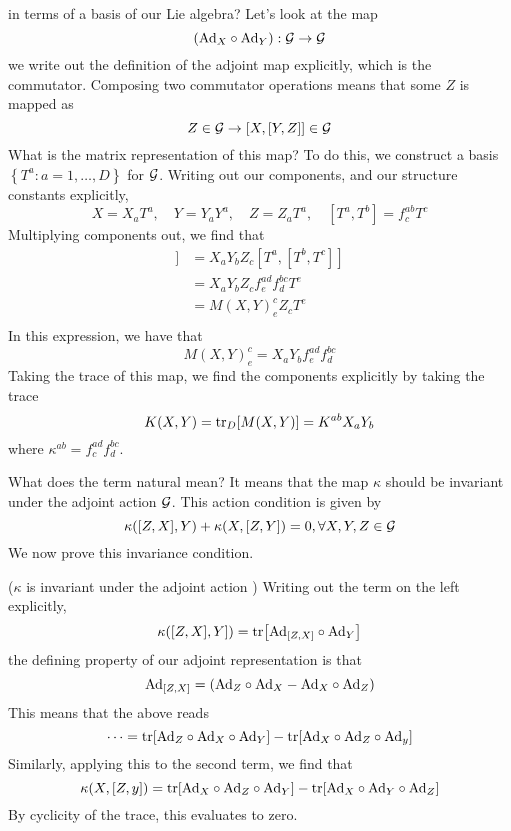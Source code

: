 in terms of a basis of our Lie algebra? Let's look at the map 
\[
 ( \text{Ad}_ X \circ \text{Ad}_ Y ) : \mathcal{ G } \to \mathcal{ G } 
\] we write out the definition of the 
adjoint map explicitly, which is the commutator. 
Composing two commutator operations means that some $ Z $ is mapped 
as
\[
 Z \in \mathcal{ G } \to [ X , [ Y , Z ] ] \in \mathcal{ G }
\] What is the matrix representation of this map? 
To do this, we construct a basis $ \left\{  T ^ a : a = 1, \dots , D  \right\} $ 
for $ \mathcal{ G }$. 
Writing out our components, and our structure constants explicitly, 
 \[
 X  = X_ a T ^ a , \quad 
 Y = Y  _a Y ^ a , \quad
 Z = Z_ a T ^ a, 
 \quad [ T ^ a , T ^ b ] = f ^{ ab } _ c T ^ c 
\] Multiplying components out, 
we find that 
\begin{align*}
	[ X. [ Y , Z ] ] &=  X_a Y _ b Z_ c [ T ^ a , [ T ^ b , T ^ c ]] \\
	&=  X_ a Y _ b Z _ c f ^{ ad } _ e f ^{ bc } _ d T ^ e  \\
	&=  M ( X, Y ) ^ c _ e  Z_ c T ^ e  \\
\end{align*} 
In this expression, we have that 
\[
 M ( X , Y ) ^ c _ e  = X_ a Y _ b f^{ ad } _ e f ^{ bc } _ d 
\] Taking the trace of this map, we 
find the components explicitly by 
taking the trace 
\[
 K ( X, Y ) = \tr _ D [ M ( X, Y ) ] = K ^{ ab } X_ a Y _ b 
\] where $ \kappa ^{ ab } = f ^{ ad } _ c f ^{ bc } _  d$. 

What does the term natural mean? 
It means that the map $ \kappa $ should be invariant under the 
adjoint action $ \mathcal{ G } $. This action condition 
is given by 
 \[
 \kappa ( [ Z, X] , Y ) + \kappa ( X, [ Z, Y ] )  = 0, \forall X, Y , Z \in \mathcal{ G } 
\]
We now prove this invariance condition. 
\begin{thm}{($ \kappa $ is invariant under the adjoint action ) } 
	Writing out the term on the left explicitly, 
	\[
		\kappa ( [ Z, X] , Y ] )  = \tr [ \text{Ad} _{ [ Z , X ] } \circ \text{Ad}_Y ] 
	\] the defining property of our adjoint 
	representation is that 
	\[
		\text{Ad}_{ [ Z, X ] }  = ( \text{Ad} _ Z \circ \text{Ad}_ X - \text{Ad} _ X \circ \text{Ad} _ Z ) 
	\] This means that the above reads 
	\[
	 \dots = \tr [ \text{Ad}_ Z \circ \text{Ad}_ X \circ \text{Ad}_ Y ] - \tr [ \text{Ad}_ X \circ 
	 \text{Ad}_ Z \circ \text{Ad}_ y ] 
	\] Similarly, applying this to the second term, 
	we find that 
	\[
	 \kappa ( X, [ Z, y ] )  = 
	 \tr [ \text{Ad}_ X \circ \text{Ad} _ Z \circ \text{Ad}_ Y ] - \tr [ \text{Ad}_ X \circ \text{Ad}_ Y \circ \text{Ad}_ Z ] 
	\] By cyclicity of the trace, this evaluates to zero. 

\end{thm}


